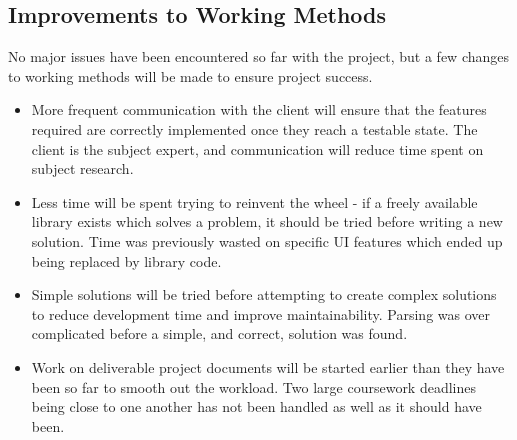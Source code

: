 \subsection{Improvements to Working Methods}
No major issues have been encountered so far with the project, but a few changes to working methods will be made to ensure project success. 
\begin{itemize}
    \item More frequent communication with the client will ensure that the features required are correctly implemented once they reach a testable state. The client is the subject expert, and communication will reduce time spent on subject research.
    \item Less time will be spent trying to reinvent the wheel - if a freely available library exists which solves a problem, it should be tried before writing a new solution. Time was previously wasted on specific UI features which ended up being replaced by library code.
    \item Simple solutions will be tried before attempting to create complex solutions to reduce development time and improve maintainability. Parsing was over complicated before a simple, and correct, solution was found.
    \item Work on deliverable project documents will be started earlier than they have been so far to smooth out the workload. Two large coursework deadlines being close to one another has not been handled as well as it should have been.
\end{itemize} 